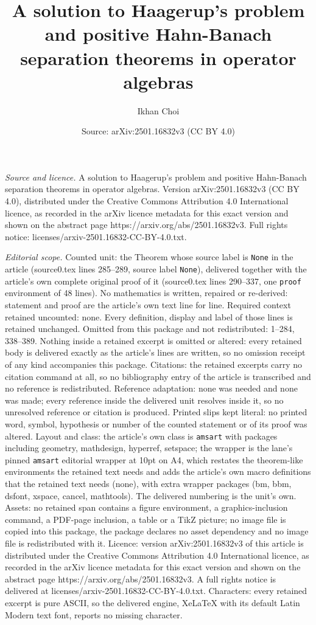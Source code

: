 \documentclass[10pt,a4paper]{amsart}
\title[A solution to Haagerup's problem and positive Hahn-Banach se]{A solution to Haagerup's problem and positive Hahn-Banach separation theorems in operator algebras}
\author{Ikhan Choi}
\date{Source: arXiv:2501.16832v3 (CC BY 4.0)}
\begin{document}
\maketitle

\noindent\emph{Source and licence.} A solution to Haagerup's problem and positive Hahn-Banach separation theorems in operator algebras. Version arXiv:2501.16832v3 (CC BY 4.0), distributed under the Creative Commons Attribution 4.0 International licence, as recorded in the arXiv licence metadata for this exact version and shown on the abstract page https://arxiv.org/abs/2501.16832v3. Full rights notice: licenses/arxiv-2501.16832-CC-BY-4.0.txt.\par\smallskip

\noindent\textit{Editorial scope.} Counted unit: the Theorem whose source label is \texttt{None} in the article (source0.tex lines 285--289, source label \texttt{None}), delivered together with the article's own complete original proof of it (source0.tex lines 290--337, one \texttt{proof} environment of 48 lines). No mathematics is written, repaired or re-derived: statement and proof are the article's own text line for line. Required context retained uncounted: none. Every definition, display and label of those lines is retained unchanged. Omitted from this package and not redistributed: 1--284, 338--389. Nothing inside a retained excerpt is omitted or altered: every retained body is delivered exactly as the article's lines are written, so no omission receipt of any kind accompanies this package. Citations: the retained excerpts carry no citation command at all, so no bibliography entry of the article is transcribed and no reference is redistributed. Reference adaptation: none was needed and none was made; every reference inside the delivered unit resolves inside it, so no unresolved reference or citation is produced. Printed slips kept literal: no printed word, symbol, hypothesis or number of the counted statement or of its proof was altered. Layout and class: the article's own class is \texttt{amsart} with packages including geometry, mathdesign, hyperref, setspace; the wrapper is the lane's pinned \texttt{amsart} editorial wrapper at 10pt on A4, which restates the theorem-like environments the retained text needs and adds the article's own macro definitions that the retained text needs (none), with extra wrapper packages (bm, bbm, dsfont, xspace, cancel, mathtools). The delivered numbering is the unit's own. Assets: no retained span contains a figure environment, a graphics-inclusion command, a PDF-page inclusion, a table or a TikZ picture; no image file is copied into this package, the package declares no asset dependency and no image file is redistributed with it. Licence: version arXiv:2501.16832v3 of this article is distributed under the Creative Commons Attribution 4.0 International licence, as recorded in the arXiv licence metadata for this exact version and shown on the abstract page https://arxiv.org/abs/2501.16832v3. A full rights notice is delivered at licenses/arxiv-2501.16832-CC-BY-4.0.txt. Characters: every retained excerpt is pure ASCII, so the delivered engine, XeLaTeX with its default Latin Modern text font, reports no missing character.
\end{document}
